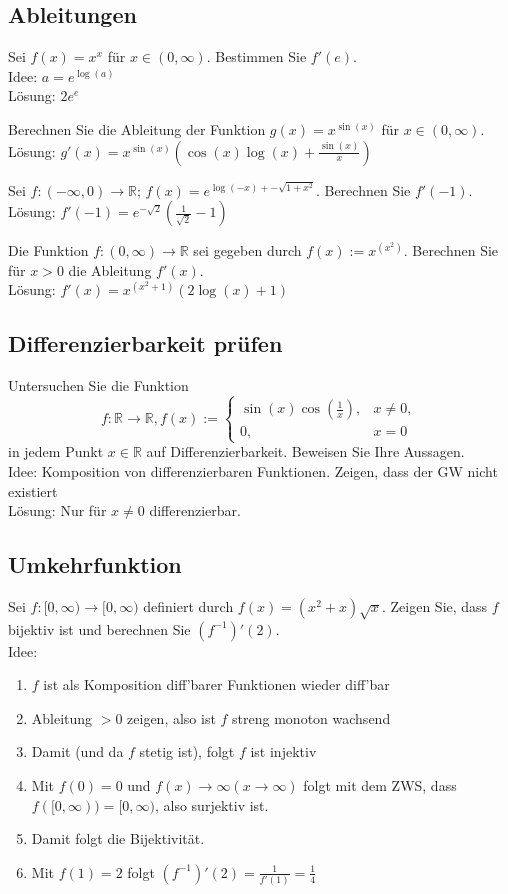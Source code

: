 \subsection{Ableitungen}
Sei $f(x) = x^x$ für $x \in (0,\infty)$.
Bestimmen Sie $f'(e)$.\\
Idee: $a = e^{\log(a)}$\\
Lösung: $2e^e$

Berechnen Sie die Ableitung der Funktion $g(x) = x^{\sin(x)}$ für $x \in (0,\infty)$.\\
Lösung: $g'(x) = x^{\sin(x)} \left(\cos(x)\log(x) + \frac{\sin(x)}{x}\right)$

Sei $f : (-\infty, 0) \to \mathbb{R}$; $f(x) = e^{\log(-x) + - \sqrt{1 + x^2}}$.
Berechnen Sie $f'(-1)$.\\
Lösung: $f'(-1) = e^{-\sqrt{2}}\left(\frac{1}{\sqrt{2}} - 1\right)$

Die Funktion $f:(0,\infty) \to \mathbb{R}$ sei gegeben durch $f(x) := x^{(x^2)}$.
Berechnen Sie für $x > 0$ die Ableitung $f'(x)$.\\
Lösung: $f'(x) = x^{(x^2 + 1)} (2\log(x) + 1)$

\subsection{Differenzierbarkeit prüfen}
Untersuchen Sie die Funktion
\begin{displaymath}
  f:\mathbb{R} \to \mathbb{R}, f(x) :=
  \begin{cases}
    \sin(x)\cos\left(\frac{1}{x}\right),& x \neq 0,\\
    0,& x = 0
  \end{cases}
\end{displaymath}
in jedem Punkt $x \in \mathbb{R}$ auf Differenzierbarkeit.
Beweisen Sie Ihre Aussagen.\\
Idee: Komposition von differenzierbaren Funktionen. Zeigen, dass der GW nicht existiert\\
Lösung: Nur für $x \neq 0$ differenzierbar.

\subsection{Umkehrfunktion}
Sei $f: [0,\infty) \to [0,\infty)$ definiert durch $f(x) = (x^2 + x)\sqrt{x}$.
Zeigen Sie, dass $f$ bijektiv ist und berechnen Sie $(f^{-1})'(2)$.\\
Idee:
\begin{enumerate}
    \item $f$ ist als Komposition diff'barer Funktionen wieder diff'bar
    \item Ableitung $> 0$ zeigen, also ist $f$ streng monoton wachsend
    \item Damit (und da $f$ stetig ist), folgt $f$ ist injektiv
    \item Mit $f(0) = 0$ und $f(x) \to \infty (x \to \infty)$ folgt mit dem ZWS, dass $f([0,\infty)) = [0,\infty)$, also surjektiv ist.
    \item Damit folgt die Bijektivität.
    \item Mit $f(1) = 2$ folgt $(f^{-1})'(2) = \frac{1}{f'(1)} = \frac{1}{4}$
\end{enumerate}

